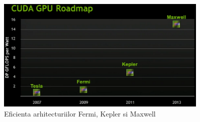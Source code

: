 \begin{figure}[ht] \centering
\includegraphics[width=0.9\textwidth]{img/fermi.png}
\caption{Eficienta arhitecturiilor Fermi, Kepler si Maxwell} \end{figure}


